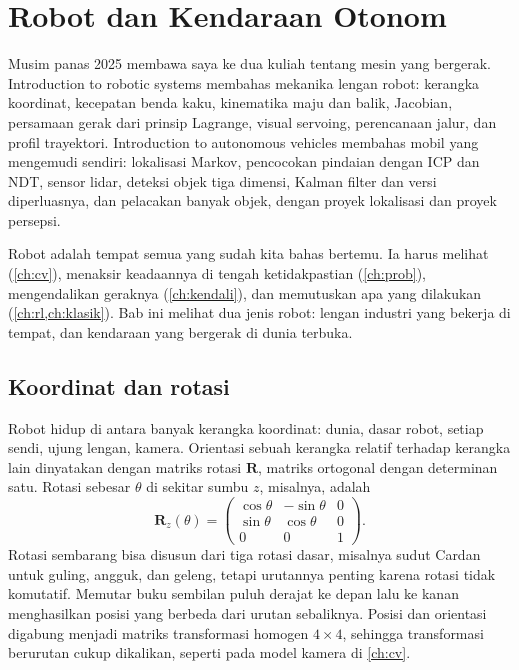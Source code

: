 \chapter{Robot dan Kendaraan Otonom}
\label{ch:robot}

Musim panas 2025 membawa saya ke dua kuliah tentang mesin yang bergerak. Introduction to robotic systems
membahas mekanika lengan robot: kerangka koordinat, kecepatan benda kaku, kinematika maju dan balik,
Jacobian, persamaan gerak dari prinsip Lagrange, visual servoing, perencanaan jalur, dan profil trayektori.
Introduction to autonomous vehicles membahas mobil yang mengemudi sendiri: lokalisasi Markov, pencocokan
pindaian dengan ICP dan NDT, sensor lidar, deteksi objek tiga dimensi, Kalman filter dan versi diperluasnya,
dan pelacakan banyak objek, dengan proyek lokalisasi dan proyek persepsi.

Robot adalah tempat semua yang sudah kita bahas bertemu. Ia harus melihat (\cref{ch:cv}), menaksir
keadaannya di tengah ketidakpastian (\cref{ch:prob}), mengendalikan geraknya (\cref{ch:kendali}), dan
memutuskan apa yang dilakukan (\cref{ch:rl,ch:klasik}). Bab ini melihat dua jenis robot: lengan industri yang
bekerja di tempat, dan kendaraan yang bergerak di dunia terbuka.

\section{Koordinat dan rotasi}

Robot hidup di antara banyak kerangka koordinat: dunia, dasar robot, setiap sendi, ujung lengan, kamera.
Orientasi sebuah kerangka relatif terhadap kerangka lain dinyatakan dengan matriks rotasi $\bm R$, matriks
ortogonal dengan determinan satu. Rotasi sebesar $\theta$ di sekitar sumbu $z$, misalnya, adalah
\begin{equation}
\bm R_z(\theta)=\begin{pmatrix}\cos\theta&-\sin\theta&0\\\sin\theta&\cos\theta&0\\0&0&1\end{pmatrix}.
\end{equation}
Rotasi sembarang bisa disusun dari tiga rotasi dasar, misalnya sudut Cardan untuk guling, angguk, dan geleng,
tetapi urutannya penting karena rotasi tidak komutatif. Memutar buku sembilan puluh derajat ke depan lalu ke
kanan menghasilkan posisi yang berbeda dari urutan sebaliknya. Posisi dan orientasi digabung menjadi matriks
transformasi homogen $4\times4$, sehingga transformasi berurutan cukup dikalikan, seperti pada model kamera di
\cref{ch:cv}.

